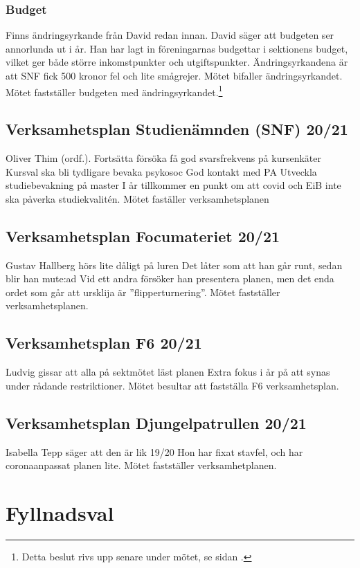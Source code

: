 \documentclass[hidelinks]{sektionsmote}
\begin{document}
\subsubsection{Budget}
Finns ändringsyrkande från David redan innan.
David säger att budgeten ser annorlunda ut i år.
Han har lagt in föreningarnas budgettar i sektionens budget, vilket ger både större inkomstpunkter och utgiftspunkter.
Ändringsyrkandena är att SNF fick 500 kronor fel och lite smågrejer.
Mötet bifaller ändringsyrkandet.
Mötet fastställer budgeten med ändringsyrkandet.\footnote{Detta beslut rivs upp senare under mötet, se sidan \pageref{uppriven-budget}.}

\subsection{Verksamhetsplan Studienämnden (SNF) 20/21}
Oliver Thim (ordf.).
Fortsätta försöka få god svarsfrekvens på kursenkäter
Kursval ska bli tydligare
bevaka psykosoc
God kontakt med PA
Utveckla studiebevakning på master
I år tillkommer en punkt om att covid och EiB inte ska påverka studiekvalitén.
Mötet faställer verksamhetsplanen
    
\subsection{Verksamhetsplan Focumateriet 20/21}
Gustav Hallberg hörs lite dåligt på luren
Det låter som att han går runt, sedan blir han mute:ad
Vid ett andra försöker han presentera planen, men det enda ordet som går att ursklija är ''flipperturnering''.
Mötet fastställer verksamhetsplanen.

\subsection{Verksamhetsplan F6 20/21}
Ludvig gissar att alla på sektmötet läst planen
Extra fokus i år på att synas under rådande restriktioner.
Mötet besultar att fastställa F6 verksamhetsplan.

\subsection{Verksamhetsplan Djungelpatrullen 20/21}
Isabella Tepp säger att den är lik 19/20
Hon har fixat stavfel, och har coronaanpassat planen lite.
Mötet fastställer verksamhetplanen.


\section{Fyllnadsval}
\end{document}
